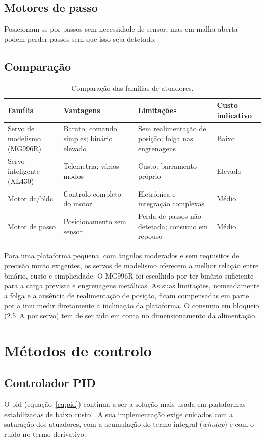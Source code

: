\subsection{Motores de passo}
Posicionam-se por passos sem necessidade de sensor, mas em malha aberta podem perder passos sem que isso seja detetado.

\subsection{Comparação}
\begin{table}[H]
\centering\small
\caption{Comparação das famílias de atuadores.}
\begin{tabularx}{\textwidth}{>{\raggedright\arraybackslash}p{2.6cm}YYY}
\toprule
Família & Vantagens & Limitações & Custo indicativo\\\midrule
Servo de modelismo (MG996R) & Barato; comando simples; binário elevado & Sem realimentação de posição; folga nas engrenagens & Baixo\\
Servo inteligente (XL430) & Telemetria; vários modos & Custo; barramento próprio & Elevado\\
Motor \acrshort{dc}/\acrshort{bldc} & Controlo completo do motor & Eletrónica e integração complexas & Médio\\
Motor de passo & Posicionamento sem sensor & Perda de passos não detetada; consumo em repouso & Médio\\
\bottomrule
\end{tabularx}
\label{tab:atuadores}
\end{table}

Para uma plataforma pequena, com ângulos moderados e sem requisitos de precisão muito exigentes, os servos de modelismo oferecem a melhor relação entre binário, custo e simplicidade. O MG996R foi escolhido por ter binário suficiente para a carga prevista e engrenagens metálicas. As suas limitações, nomeadamente a folga e a ausência de realimentação de posição, ficam compensadas em parte por a \gls{imu} medir diretamente a inclinação da plataforma. O consumo em bloqueio (\SI{2.5}{\ampere} por servo) tem de ser tido em conta no dimensionamento da alimentação.

\section{Métodos de controlo}

\subsection{Controlador PID}
O \gls{pid} (equação~\eqref{eq:pid}) continua a ser a solução mais usada em plataformas estabilizadas de baixo custo \cite{astrom2021}. A sua implementação exige cuidados com a saturação dos atuadores, com a acumulação do termo integral (\textit{windup}) e com o ruído no termo derivativo.

